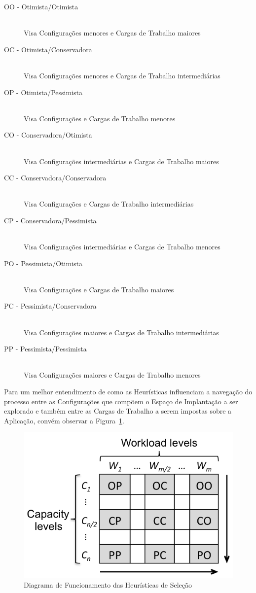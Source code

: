 \begin{description}
  \item[OO - Otimista/Otimista] \hfill \\ Visa Configurações menores e Cargas de Trabalho maiores
  \item[OC - Otimista/Conservadora] \hfill \\ Visa Configurações menores e Cargas de Trabalho intermediárias
  \item[OP - Otimista/Pessimista] \hfill \\ Visa Configurações e Cargas de Trabalho menores
  \item[CO - Conservadora/Otimista] \hfill \\ Visa Configurações intermediárias e Cargas de Trabalho maiores
  \item[CC - Conservadora/Conservadora] \hfill \\ Visa Configurações e Cargas de Trabalho intermediárias
  \item[CP - Conservadora/Pessimista] \hfill \\ Visa Configurações intermediárias e Cargas de Trabalho menores
  \item[PO - Pessimista/Otimista] \hfill \\ Visa Configurações e Cargas de Trabalho maiores
  \item[PC - Pessimista/Conservadora] \hfill \\ Visa Configurações maiores e Cargas de Trabalho intermediárias
  \item[PP - Pessimista/Pessimista] \hfill \\ Visa Configurações maiores e Cargas de Trabalho menores
\end{description}

Para um melhor entendimento de como as Heurísticas influenciam a navegação do 
processo entre as Configurações que compõem o Espaço de Implantação a ser explorado
e também entre as Cargas de Trabalho a serem impostas sobre a Aplicação, convém
observar a Figura~\ref{fig:heuristicas}.

\begin{figure}
  \caption{\label{fig:heuristicas}Diagrama de Funcionamento das Heurísticas de Seleção}
  \begin{center}
    \includegraphics[scale=1]{img/heuristics}
  \end{center}
\end{figure}

